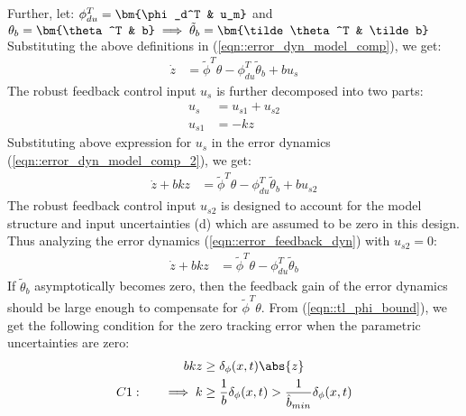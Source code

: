 Further, let: $\phi_{du}^T = \bm{\phi_d^T & u_m}$ and $\theta_{b} = \bm{\theta^T
& b} \implies \tilde \theta_b = \bm{\tilde \theta^T & \tilde b}$
Substituting the above definitions in (\ref{eqn::error_dyn_model_comp}), we get:
\begin{align}
    \dot z &= \tilde \phi^T \theta - \phi_{du}^T \tilde \theta_b + bu_s
    \label{eqn::error_dyn_model_comp_2}
\end{align}
The robust feedback control input $u_s$ is further decomposed into two parts:
\begin{align}
    u_s &= u_{s1} + u_{s2}\\
    u_{s1} &= - k z \label{eqn::u_s1_def}
\end{align}
Substituting above expression for $u_s$ in the error dynamics
(\ref{eqn::error_dyn_model_comp_2}), we get:
\begin{align}
    \dot z + bk z &= \tilde \phi^T \theta - \phi_{du}^T \tilde \theta_b + bu_{s2}
    \label{eqn::error_feedback_dyn}
\end{align}
The robust feedback control input $u_{s2}$ is designed to account for the model
structure and input uncertainties (d) which are assumed to be zero in this
design. Thus analyzing the error dynamics (\ref{eqn::error_feedback_dyn}) with
$u_{s2} = 0$:
\begin{align*}
    \dot z + bk z &= \tilde \phi^T \theta - \phi_{du}^T \tilde \theta_b
\end{align*}
If $\tilde \theta_b$ asymptotically becomes zero, then the feedback gain of the
error dynamics should be large enough to compensate for $\tilde \phi^T \theta$.
From (\ref{eqn::tl_phi_bound}), we get the following condition for the zero
tracking error when the parametric uncertainties are zero:
\begin{align}
    bkz &\geq \delta_\phi(x, t) \abs{z}\\
    C1: \qquad \implies k &\geq \frac{1}{b}\delta_\phi(x, t) > \frac{1}{\hat b_{min}} \delta_\phi(x, t)
    \label{eqn::k_bound}
\end{align}
